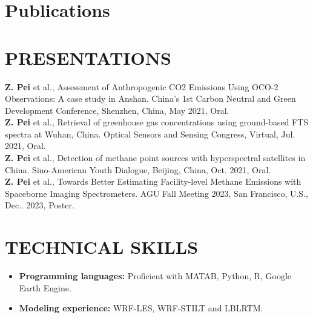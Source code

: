 \documentclass[a4paper,12pt]{article}
\begin{document}
\section{Publications}
\begin{refsection}
\nocite{*}
\printbibliography[heading=none]
\end{refsection}


\section{PRESENTATIONS}
\noindent[1]\quad\textbf{Z. Pei}  et al., Assessment of Anthropogenic CO2 Emissions Using OCO-2 Observations: A case study in Anshan. China's 1st Carbon Neutral and Green Development Conference, Shenzhen, China, May 2021, Oral. \\
\noindent[2]\quad\textbf{Z. Pei} et al., Retrieval of greenhouse gas concentrations using ground-based FTS spectra at Wuhan, China. Optical Sensors and Sensing Congress, Virtual, Jul. 2021, Oral. \\
\noindent[3]\quad\textbf{Z. Pei} et al., Detection of methane point sources with hyperspectral satellites in China. Sino-American Youth Dialogue, Beijing, China, Oct. 2021, Oral.\\
\noindent[4]\quad\textbf{Z. Pei} et al., Towards Better Estimating Facility-level Methane Emissions with Spaceborne Imaging Spectrometers. AGU Fall Meeting 2023, San Francisco, U.S., Dec.. 2023, Poster.\\

\section{TECHNICAL SKILLS}
\begin{itemize}[noitemsep,nolistsep,leftmargin=*]
	\item {\noindent \textbf{Programming languages:} Proficient with MATAB, Python, R, Google Earth Engine. }
	\item {\noindent \textbf{Modeling experience:} WRF-LES, WRF-STILT and LBLRTM. }
\end{itemize}
\end{document}
